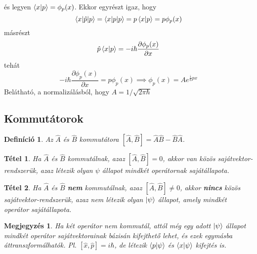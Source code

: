 \documentclass[12pt]{article}
\theoremstyle{plain}
\newcommand{\commut}[2]{\left [ #1 , #2 \right]}
\newtheorem*{theorem*}{Tétel}
\newtheorem*{def*}{Definíció}
\newtheorem*{megj}{Megjegyzés}
\begin{document}
és legyen $\braket{x|p}=\phi_p(x)$. Ekkor egyrészt igaz, hogy
\begin{equation}
    \braket{x|\hat p|p} = \braket{x|p|p} = p\braket{x|p} = p\phi_p(x)
\end{equation}
másrészt
\begin{equation}
    \hat p \braket{x|p} = -i\hbar\frac{\partial \phi_p(x)}{\partial x} 
\end{equation}
tehát
\begin{equation}
    -i\hbar\frac{\partial \phi_p(x)}{\partial x} =  p\phi_p(x) \implies \phi_p(x) = A e^{\frac{i}{\hbar} px}
\end{equation}
Belátható, a normalizálásból, hogy $A=1/\sqrt{2\pi\hbar}$
\subsection{Kommutátorok}
\begin{def*}
    Az $\hat A$ és $\hat B$ kommutátora $\commut{\hat A}{\hat B} = \hat A \hat B - \hat B \hat A$. 
\end{def*}
\begin{theorem*}
    Ha $\hat A$ és $\hat B$ kommutálnak, azaz $\commut{\hat A}{\hat B} = 0$, akkor van közös sajátvektor-rendszerük, azaz létezik olyan
    $\psi$ állapot mindkét operátornak sajátállapota.
\end{theorem*}
\begin{theorem*}
    Ha $\hat A$ és $\hat B$ \textbf{nem} kommutálnak, azaz $\commut{\hat A}{\hat B} \neq 0$, akkor \textbf{nincs} közös sajátvektor-rendszerük, azaz nem 
    létezik olyan $\ket\psi$ állapot, amely mindkét operátor sajátállapota.
\end{theorem*}
\begin{megj}
    Ha két operátor nem kommutál, attól még egy adott $\ket\psi$ állapot mindkét operátor sajátvektorainak bázisán kifejthető lehet,
    és ezek egymásba áttranszformálhatók. Pl. $\commut{\hat x}{\hat p} = i\hbar$, de létezik $\braket{p|\psi}$ és $\braket{x|\psi}$
    kifejtés is.
\end{megj}
\end{document}
